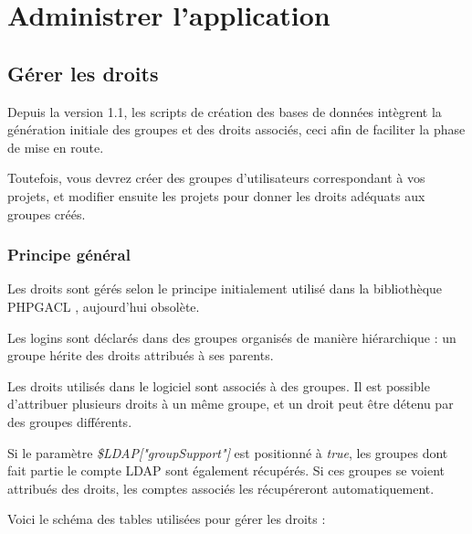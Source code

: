 \chapter{Administrer l'application}

\section{Gérer les droits}
\label{droits}

Depuis la version 1.1, les scripts de création des bases de données intègrent la génération initiale des groupes et des droits associés, ceci afin de faciliter la phase de mise en route.

Toutefois, vous devrez créer des groupes d'utilisateurs correspondant à vos projets, et modifier ensuite les projets pour donner les droits adéquats aux groupes créés.

\subsection{Principe général}

Les droits sont gérés selon le principe initialement utilisé dans la bibliothèque PHPGACL \cite{phpgacl}, aujourd'hui obsolète. 

Les logins sont déclarés dans des groupes organisés de manière hiérarchique : un groupe hérite des droits attribués à ses parents.

Les droits utilisés dans le logiciel sont associés à des groupes. Il est possible d'attribuer plusieurs droits à un même groupe, et un droit peut être détenu par des groupes différents.

Si le paramètre \textit{\$LDAP["groupSupport"]} est positionné à \textit{true}, les groupes dont fait partie le compte LDAP sont également récupérés. Si ces groupes se voient attribués des droits, les comptes associés les récupéreront automatiquement.

Voici le schéma des tables utilisées pour gérer les droits :


